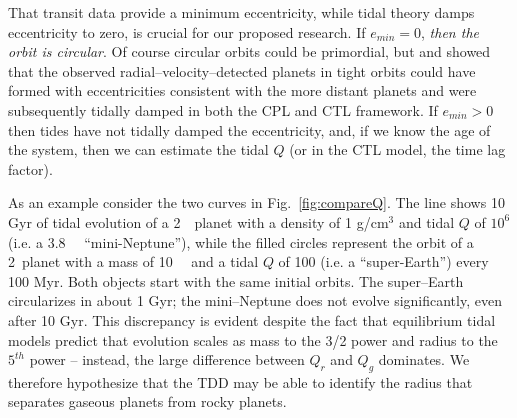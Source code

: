 That transit data provide a minimum eccentricity, while tidal theory
damps eccentricity to zero, is crucial for our proposed research. If
$e_{min} = 0$, \textit{then the orbit is circular}.  Of course
circular orbits could be primordial, but \cite{Jackson08}
and \cite{Matsumura10} showed that the observed
radial--velocity--detected planets in tight orbits could have formed
with eccentricities consistent with the more distant planets and were
subsequently tidally damped in both the CPL and CTL framework.  If
$e_{min} > 0$ then tides have not tidally damped the eccentricity,
and, if we know the age of the system, then we can estimate the tidal
$Q$ (or in the CTL model, the time lag factor).

As an example consider the two curves in Fig.~\ref{fig:compareQ}.  The
line shows 10 Gyr of tidal evolution of a 2~\rearth~planet with a
density of 1 g/cm$^3$ and tidal $Q$ of $10^6$ (i.e. a 3.8~\mearth~
``mini-Neptune''), while the filled circles represent the orbit of a
2~\rearth planet with a mass of 10~\mearth~ and a tidal $Q$ of 100
(i.e. a ``super-Earth'') every 100 Myr.  Both objects start with the
same initial orbits.  The super--Earth circularizes in about 1 Gyr;
the mini--Neptune does not evolve significantly, even after 10 Gyr.
This discrepancy is evident despite the fact that equilibrium tidal
models predict that evolution scales as mass to the 3/2 power and
radius to the $5^{th}$ power -- instead, the large difference between
$Q_r$ and $Q_g$ dominates.  We therefore hypothesize that the TDD may
be able to identify the radius that separates gaseous planets from
rocky planets.

